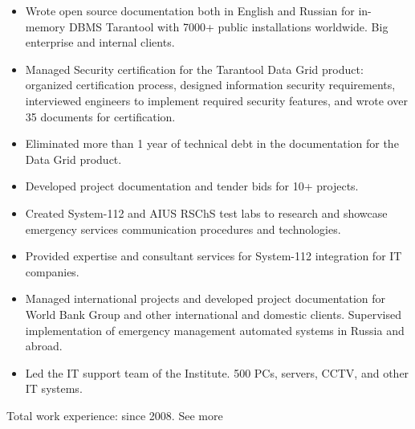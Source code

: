 \documentclass[10pt,a4paper]{altacv}
\begin{document}
\begin{itemize}
\item Wrote open source documentation both in English and Russian for in-memory DBMS Tarantool
with 7000+ public installations worldwide. Big enterprise and internal clients.
\item Managed Security certification for the Tarantool Data Grid product: organized certification process, designed information security requirements, interviewed engineers to implement required security
features, and wrote over 35 documents for certification.
\item Eliminated more than 1 year of technical debt in the documentation for the Data Grid product.
\item Developed project documentation and tender bids for 10+ projects.
\end{itemize}
\begin{itemize}
\item Created System-112 and AIUS RSChS test labs to research and showcase emergency services communication procedures and technologies.
\item Provided expertise and consultant services for System-112 integration for IT companies.
\item Managed international projects and developed project documentation for World Bank Group and other international and domestic clients. Supervised implementation of emergency management automated systems in Russia and abroad.
\item Led the IT support team of the Institute. 500 PCs, servers, CCTV, and other IT systems.
\end{itemize}
\divider
\begin{fullwidth}
Total work experience: since 2008. See more 
\end{fullwidth}

\end{document}
